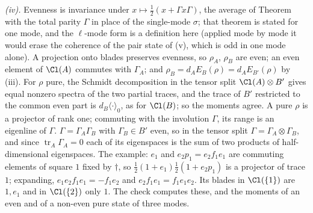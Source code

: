 \emph{(iv).} Evenness is invariance under $x \mapsto \tfrac12(x + \Gamma x\Gamma)$, the average of Theorem  with the total parity $\Gamma$ in place of the single-mode $\sigma$; that theorem is stated for one mode, and the $\ell$-mode form is a definition here (applied mode by mode it would erase the coherence of the pair state of (v), which is odd in one mode alone). A projection onto blades preserves evenness, so $\rho_{A}$, $\rho_{B}$ are even; an even element of $\Cl(A)$ commutes with $\Gamma_{A}$; and $\rho_{B} = d_{A}E_{B}(\rho) = d_{A}E_{B'}(\rho)$ by (iii). For $\rho$ pure, the Schmidt decomposition in the tensor split $\Cl(A) \otimes B'$ gives equal nonzero spectra of the two partial traces, and the trace of $B'$ restricted to the common even part is $d_{B}\langle\cdot\rangle_{0}$, as for $\Cl(B)$; so the moments agree. A pure $\rho$ is a projector of rank one; commuting with the involution $\Gamma$, its range is an eigenline of $\Gamma$. $\Gamma = \Gamma_{A}\Gamma_{B}$ with $\Gamma_{B} \in B'$ even, so in the tensor split $\Gamma = \Gamma_{A} \otimes \Gamma_{B}$, and since $\operatorname{tr}_{A}\Gamma_{A} = 0$ each of its eigenspaces is the sum of two products of half-dimensional eigenspaces. The example: $e_{1}$ and $e_{2}p_{1} = e_{2}f_{1}e_{1}$ are commuting elements of square $1$ fixed by $\dagger$, so $\tfrac12(1 + e_{1})\tfrac12(1 + e_{2}p_{1})$ is a projector of trace $1$; expanding, $e_{1}e_{2}f_{1}e_{1} = -f_{1}e_{2}$ and $e_{2}f_{1}e_{1} = f_{1}e_{1}e_{2}$. Its blades in $\Cl(\{1\})$ are $1, e_{1}$ and in $\Cl(\{2\})$ only $1$. The check computes these, and the moments of an even and of a non-even pure state of three modes.


